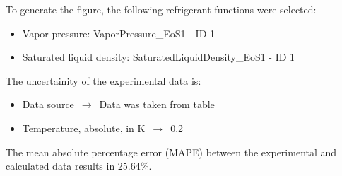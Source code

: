 To generate the figure, the following refrigerant functions were selected:
\begin{itemize}
\item Vapor pressure: VaporPressure\_EoS1 - ID 1
\item Saturated liquid density: SaturatedLiquidDensity\_EoS1 - ID 1
\end{itemize}

The uncertainity of the experimental data is:
\begin{itemize}
\item Data source $\,\to\,$ Data was taken from table
\item Temperature, absolute, in $\si{\kelvin}$ $\,\to\,$ 0.2
\end{itemize}

The mean absolute percentage error (MAPE) between the experimental and calculated data results in 25.64\%.
\FloatBarrier
\newpage
